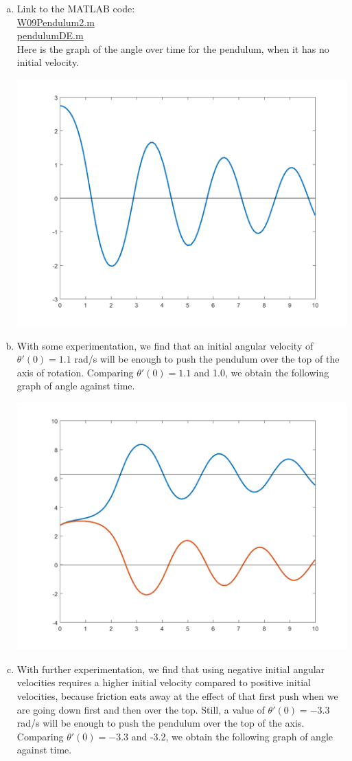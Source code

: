 \begin{enumerate}[1.]
\begin{Question}
\end{Question}

\begin{Solution}

\begin{enumerate}[(a)]
\item 
Link to the MATLAB code: \\
\href{http://www.mast.queensu.ca/~apsc171/MNTCP01/PracticeProblems/MATLAB/W09Pendulum2.m}{W09Pendulum2.m} \\
\href{http://www.mast.queensu.ca/~apsc171/MNTCP01/PracticeProblems/MATLAB/pendulumDE.m}{pendulumDE.m} \\

Here is the graph of the angle over time for the pendulum, when it has no initial velocity.

\includegraphics[width=0.45\linewidth]{graphics/Week09_Pendulum/pendulum_overtop_1} 

\item With some experimentation, we find that an initial angular
  velocity of $\theta'(0) = 1.1$ rad/s will be enough to push the
  pendulum over the top of the axis of rotation. Comparing
  $\theta'(0) = 1.1$ and 1.0, we obtain the following graph of angle
  against time.

\includegraphics[width=0.5\linewidth]{graphics/Week09_Pendulum/pendulum_overtop_2} 

\item With further experimentation, we find that using negative
  initial angular velocities requires a higher initial velocity
  compared to positive initial velocities, because friction eats away
  at the effect of that first push when we are going down first and
  then over the top.  Still, a value of $\theta'(0) = -3.3$ rad/s will
  be enough to push the pendulum over the top of the axis. Comparing
  $\theta'(0) = -3.3$ and -3.2, we obtain the following graph of angle
  against time.


\end{enumerate}
\end{Solution}
\end{enumerate}
